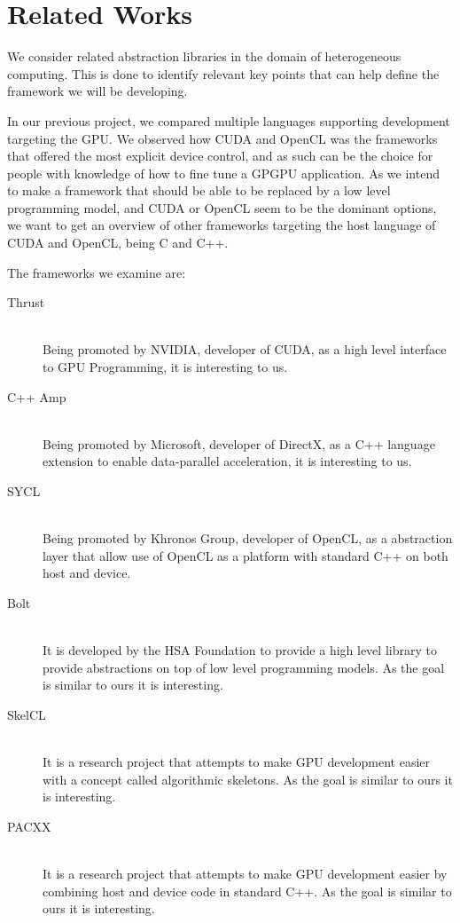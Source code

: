 \section{Related Works}
We consider related abstraction libraries in the domain of heterogeneous computing. This is done to identify relevant key points that can help define the framework we will be developing.

In our previous project, we compared multiple languages supporting development targeting the GPU\cite{sw9Report}. We observed how CUDA and OpenCL was the frameworks that offered the most explicit device control, and as such can be the choice for people with knowledge of how to fine tune a GPGPU application. As we intend to make a framework that should be able to be replaced by a low level programming model, and CUDA or OpenCL seem to be the dominant options, we want to get an overview of other frameworks targeting the host language of CUDA and OpenCL, being C and C++.

The frameworks we examine are:
\begin{description}
\item[Thrust] \hfill \\
Being promoted by NVIDIA, developer of CUDA, as a high level interface to GPU Programming, it is interesting to us\cite{thrustNvidia}.
\item[C++ Amp] \hfill \\
Being promoted by Microsoft, developer of DirectX, as a C++ language extension to enable data-parallel acceleration, it is interesting to us\cite{microsoftCppAMP}.
\item[SYCL] \hfill \\
Being promoted by Khronos Group, developer of OpenCL, as a abstraction layer that allow use of OpenCL as a platform with standard C++ on both host and device\cite{khronosSYCL}.
\item[Bolt] \hfill \\
It is developed by the HSA Foundation to provide a high level library to provide abstractions on top of low level programming models. As the goal is similar to ours it is interesting\cite{boltDoc}.
\item[SkelCL] \hfill \\
It is a research project that attempts to make GPU development easier with a concept called algorithmic skeletons. As the goal is similar to ours it is interesting\cite{skelclPaper}.
\item[PACXX] \hfill \\
It is a research project that attempts to make GPU development easier by combining host and device code in standard C++. As the goal is similar to ours it is interesting\cite{pacxxPaper}.
\end{description}


